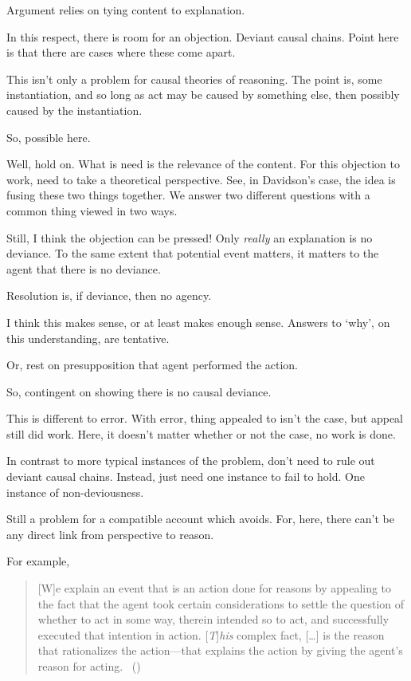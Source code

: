 \begin{note}
  Argument relies on tying content to explanation.

  In this respect, there is room for an objection.
  Deviant causal chains.
  Point here is that there are cases where these come apart.

  This isn't only a problem for causal theories of reasoning.
  The point is, some instantiation, and so long as act may be caused by something else, then possibly caused by the instantiation.

  So, possible here.

  Well, hold on.
  What is need is the relevance of the content.
  For this objection to work, need to take a theoretical perspective.
  See, in Davidson's case, the idea is fusing these two things together.
  We answer two different questions with a common thing viewed in two ways.

  Still, I think the objection can be pressed!
  Only \emph{really} an explanation is no deviance.
  To the same extent that potential event matters, it matters to the agent that there is no deviance.

  {
    \color{red}
    Resolution is, if deviance, then no agency.
  }

  I think this makes sense, or at least makes enough sense.
  Answers to `why', on this understanding, are tentative.

  Or, rest on presupposition that agent performed the action.

  So, contingent on showing there is no causal deviance.

  This is different to error.
  With error, thing appealed to isn't the case, but appeal still did work.
  Here, it doesn't matter whether or not the case, no work is done.

  In contrast to more typical instances of the problem, don't need to rule out deviant causal chains.
  Instead, just need one instance to fail to hold.
  One instance of non-deviousness.

  Still a problem for a compatible account which avoids.
  For, here, there can't be any direct link from perspective to reason.

  For example, \citeauthor{Hieronymi:2011aa}

    \begin{quote}
      [W]e explain an event that is an action done for reasons by appealing to the fact that the agent took certain considerations to settle the question of whether to act in some way, therein intended so to act, and successfully executed that intention in action.
    [\emph{T}]\emph{his} complex fact, [\dots] is the reason that rationalizes the action---that explains the action by giving the agent's reason for acting.%
    \mbox{ }\hfill\mbox{(\citeyear[431]{Hieronymi:2011aa})}
  \end{quote}


\end{note}

